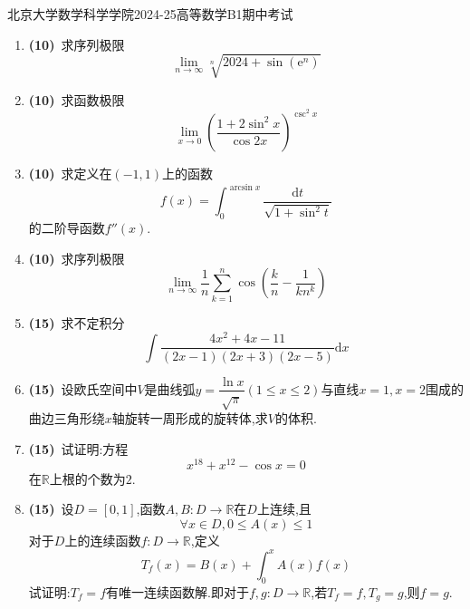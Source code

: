 \documentclass{ctexart}
\newcommand{\e}{\mathrm{e}}
\newcommand{\di}{\mathrm{d}}
\newcommand{\R}{\mathbb{R}}
\newcommand{\dx}{\di x}
\begin{document}
\pagestyle{empty}
\begin{center}\Large
    北京大学数学科学学院2024-25高等数学B1期中考试
\end{center}
\begin{enumerate}[leftmargin=*,label=\textbf{\arabic*.}]
    \item \textbf{(10)}\ 求序列极限$$\lim_{n\to\infty}{\sqrt[n]{2024+\sin\left(\e^n\right)}}$$
    \item \textbf{(10)}\ 求函数极限$$\lim_{x\to0}\left(\dfrac{1+2\sin^2x}{\cos2x}\right)^{\csc^2x}$$
    \item \textbf{(10)}\ 求定义在$(-1,1)$上的函数$$f(x)=\int_0^{\arcsin x}\dfrac{\di t}{\sqrt{1+\sin^2t}}$$的二阶导函数$f''(x)$.
    \item \textbf{(10)}\ 求序列极限$$\lim_{n\to\infty}\dfrac{1}{n}\sum_{k=1}^{n}\cos\left(\dfrac{k}{n}-\dfrac{1}{kn^k}\right)$$
    \item \textbf{(15)}\ 求不定积分$$\int{\dfrac{4x^2+4x-11}{(2x-1)(2x+3)(2x-5)}\dx}$$
    \item \textbf{(15)}\ 设欧氏空间中$V$是曲线弧$\displaystyle y=\dfrac{\ln{x}}{\sqrt{\pi}}(1\leqslant x\leqslant 2)$与直线$x=1,x=2$围成的曲边三角形绕$x$轴旋转一周形成的旋转体,求$V$的体积.
    \item \textbf{(15)}\ 试证明:方程$$x^{18}+x^{12}-\cos x=0$$在$\R$上根的个数为$2$.
    \item \textbf{(15)}\ 设$D=[0,1]$,函数$A,B:D\to\R$在$D$上连续,且$$\forall x\in D,0\leqslant A(x)\leqslant 1$$
        对于$D$上的连续函数$f:D\to\R$,定义$$T_f(x)=B(x)+\int_0^xA(x)f(x)$$试证明:$T_f=f$有唯一连续函数解.即对于$f,g:D\to\R$,若$T_f=f,T_g=g$,则$f=g$.
\end{enumerate}
\end{document}
